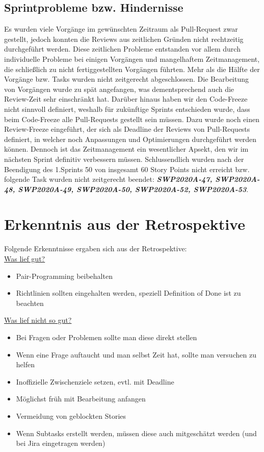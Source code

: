 \documentclass[12pt,a4paper, oneside]{article}
\begin{document}
    \subsection{Sprintprobleme bzw. Hindernisse}
    Es wurden viele Vorgänge im gewünschten Zeitraum als Pull-Request zwar gestellt, jedoch konnten die Reviews aus zeitlichen Gründen nicht rechtzeitig durchgeführt werden. Diese zeitlichen Probleme entstanden vor allem durch individuelle Probleme bei einigen Vorgängen und mangelhaftem Zeitmanagement, die schließlich zu nicht fertiggestellten Vorgängen führten. Mehr als die Hälfte der Vorgänge bzw. Tasks wurden nicht zeitgerecht abgeschlossen. Die Bearbeitung von Vorgängen wurde zu spät angefangen, was dementsprechend auch die Review-Zeit sehr einschränkt hat. Darüber hinaus haben wir den Code-Freeze nicht sinnvoll definiert, weshalb für zukünftige Sprints entschieden wurde, dass beim Code-Freeze alle Pull-Requests gestellt sein müssen. Dazu wurde noch einen Review-Freeze eingeführt, der sich als Deadline der Reviews von Pull-Requests definiert, in welcher noch Anpassungen und Optimierungen durchgeführt werden können. Dennoch ist das Zeitmanagement ein wesentlicher Apsekt, den wir im nächsten Sprint definitiv verbessern müssen. Schlussendlich wurden nach der Beendigung des 1.Sprints 50 von insgesamt 60 Story Points nicht erreicht bzw. folgende Task wurden nicht zeitgerecht beendet: \textit{\textbf{SWP2020A-47, SWP2020A-48, SWP2020A-49, SWP2020A-50, SWP2020A-52, SWP2020A-53}}.


    \section{Erkenntnis aus der Retrospektive}
    Folgende Erkenntnisse ergaben sich aus der Retrospektive:\\

    \underline{Was lief gut?}
    \begin{itemize}
        \item Pair-Programming beibehalten
        \item Richtlinien sollten eingehalten werden, speziell Definition of Done ist zu beachten
        \\
    \end{itemize}

    \underline{Was lief nicht so gut?}
    \begin{itemize}
        \item Bei Fragen oder Problemen sollte man diese direkt stellen
        \item Wenn eine Frage auftaucht und man selbst Zeit hat, sollte man versuchen zu helfen
        \item Inoffizielle Zwischenziele setzen, evtl. mit Deadline
        \item Möglichst früh mit Bearbeitung anfangen
        \item Vermeidung von geblockten Stories
        \item Wenn Subtasks erstellt werden, müssen diese auch mitgeschätzt werden (und bei Jira eingetragen werden)
        \\
    \end{itemize}
\end{document}
